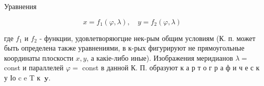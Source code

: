 \documentclass[10pt]{article}
\begin{document}
Уравнения



\[

x=f_{1}(\varphi, \lambda), \quad y=f_{2}(\varphi, \lambda)

\]



где $f_{1}$ и $f_{2}$ - функции, удовлетворяюгцие нек-рым общим условиям (К. п. может быть определена также уравнениями, в к-рых фигурируют не прямоугольные координаты плоскости $x, y$, а какіе-либо иные). Изображения меридианов $\lambda=$ const и параллелей $\varphi=$ const в данной К. П. образуют к а р т о г р а ф и ч е с к у Іо c e T к $\mathbf{~ y . ~}$
\end{document}
